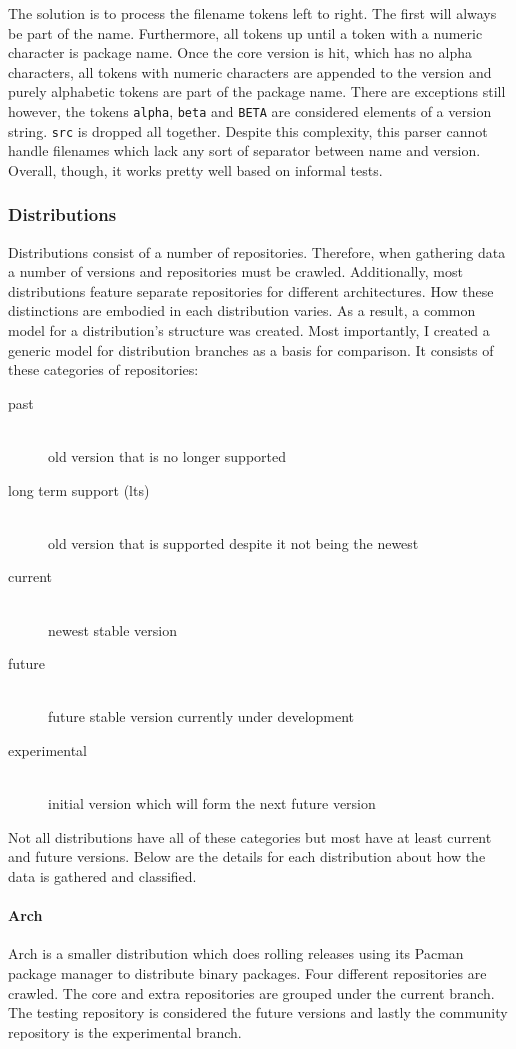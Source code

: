 \documentclass[letterpaper,10pt]{article}
\begin{document}
The solution is to process the filename tokens left to right.  The first will always be part of the name.  Furthermore, all tokens up until a token with a numeric character is package name.  Once the core version is hit, which has no alpha characters, all tokens with numeric characters are appended to the version and purely alphabetic tokens are part of the package name.  There are exceptions still however, the tokens \texttt{alpha}, \texttt{beta} and \texttt{BETA} are considered elements of a version string.  \texttt{src} is dropped all together.  Despite this complexity, this parser cannot handle filenames which lack any sort of separator between name and version.  Overall, though, it works pretty well based on informal tests.
\subsubsection{Distributions}
Distributions consist of a number of repositories.  Therefore, when gathering data a number of versions and repositories must be crawled.  Additionally, most distributions feature separate repositories for different architectures.  How these distinctions are embodied in each distribution varies.  As a result, a common model for a distribution's structure was created.  Most importantly, I created a generic model for distribution branches as a basis for comparison.  It consists of these categories of repositories:
\begin{description}
\item[past] \hfill \\
  old version that is no longer supported
\item[long term support (lts)] \hfill \\
  old version that is supported despite it not being the newest
\item[current] \hfill \\
  newest stable version
\item[future] \hfill \\
  future stable version currently under development
\item[experimental] \hfill \\
  initial version which will form the next future version
\end{description}
Not all distributions have all of these categories but most have at least current and future versions.  Below are the details for each distribution about how the data is gathered and classified.
\paragraph{Arch}
Arch is a smaller distribution which does rolling releases using its Pacman package manager to distribute binary packages.  Four different repositories are crawled. The core and extra repositories are grouped under the current branch.  The testing repository is considered the future versions and lastly the community repository is the experimental branch.
\end{document}
